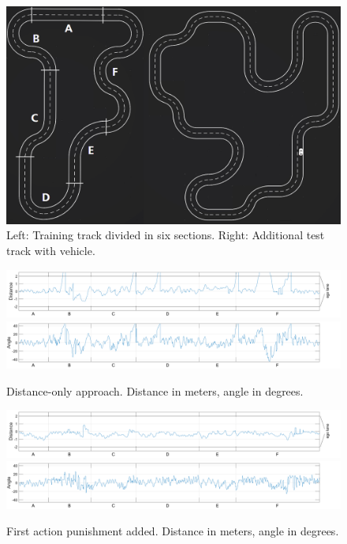 
\begin{figure}[!t]
\centering
\includegraphics[scale=0.24]{../plots/track_both}
\caption{Left: Training track divided in six sections. Right: Additional test track with vehicle.}
\label{track}
\end{figure}

\begin{figure}[!t]
\centering
\includegraphics[scale=0.265]{../plots/dist_eval_log_distance_serpentine_06speed}
\vspace{0.5em}
\includegraphics[scale=0.265]{../plots/ang_eval_log_distance_serpentine_06speed}
\vspace{-2.25em}
\caption{Distance-only approach. Distance in meters, angle in degrees.}
\label{distance06}
\vspace{1em}
\includegraphics[scale=0.265]{../plots/dist_eval_log_dumb_actions_serpentine_06speed}
\vspace{0.5em}
\includegraphics[scale=0.265]{../plots/ang_eval_log_dumb_actions_serpentine_06speed}
\vspace{-2.25em}
\caption{First action punishment added. Distance in meters, angle in degrees.}
\label{dumbactions06}
\end{figure}

